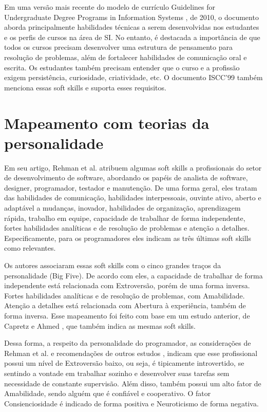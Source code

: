 Em uma versão mais recente do modelo de currículo Guidelines for Undergraduate Degree Programs in Information Systems \cite{is10}, de 2010, o documento aborda principalmente habilidades técnicas a serem desenvolvidas nos estudantes e os perfis de cursos na área de SI. No entanto, é destacada a importância de que todos os cursos precisam desenvolver uma estrutura de pensamento para resolução de problemas, além de fortalecer habilidades de comunicação oral e escrita. Os estudantes também precisam entender que o curso e a profissão exigem persistência, curiosidade, criatividade, etc. O documento ISCC'99 também menciona essas soft skills e suporta esses requisitos.

\section{Mapeamento com teorias da personalidade}
\label{sec:mapeamento}

Em seu artigo, Rehman et al. \cite{rehman:12} atribuem algumas soft skills a profissionais do setor de desenvolvimento de software, abordando os papéis de analista de software, designer, programador, testador e manutenção. De uma forma geral, eles tratam das habilidades de comunicação, habilidades interpessoais, ouvinte ativo, aberto e adaptável a mudanças, inovador, habilidades de organização, aprendizagem rápida, trabalho em equipe, capacidade de trabalhar de forma independente, fortes habilidades analíticas e de resolução de problemas e atenção a detalhes. Especificamente, para os programadores eles indicam as três últimas soft skills como relevantes.

Os autores associaram essas soft skills com o cinco grandes traços da personalidade (Big Five). De acordo com eles, a capacidade de trabalhar de forma independente está relacionada com Extroversão, porém de uma forma inversa. Fortes habilidades analíticas e de resolução de problemas, com Amabilidade. Atenção a detalhes está relacionada com Abertura à experiência, também de forma inversa. Esse mapeamento foi feito com base em um estudo anterior, de Capretz e Ahmed \cite{capretz:10}, que também indica as mesmas soft skills.

Dessa forma, a respeito da personalidade do programador, as considerações de Rehman et al. \cite{rehman:12} e recomendações de outros estudos \cite{sodiya:07} \cite{martinez:11}, indicam que esse profissional possui um nível de Extroversão baixo, ou seja, é tipicamente introvertido, se sentindo a vontade em trabalhar sozinho e desenvolver suas tarefas sem necessidade de constante supervisão. Além disso, também possui um alto fator de Amabilidade, sendo alguém que é confiável e cooperativo. O fator Consienciosidade é indicado de forma positiva e Neuroticismo de forma negativa.

